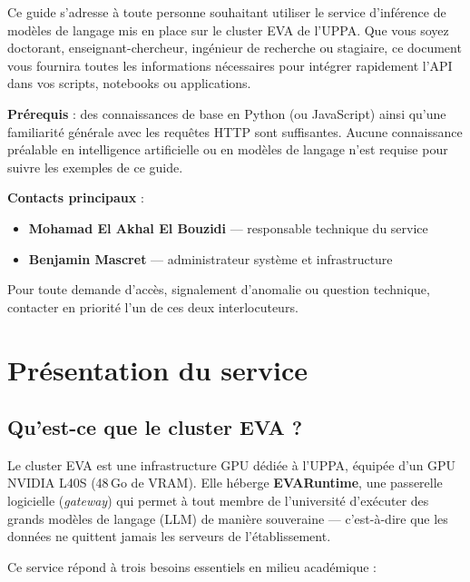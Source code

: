 \documentclass[12pt, a4paper, twoside]{article}
\begin{document}
Ce guide s'adresse à toute personne souhaitant utiliser le service d'inférence de modèles de
langage mis en place sur le cluster EVA de l'UPPA. Que vous soyez doctorant, enseignant-chercheur,
ingénieur de recherche ou stagiaire, ce document vous fournira toutes les informations nécessaires
pour intégrer rapidement l'API dans vos scripts, notebooks ou applications.

\textbf{Prérequis} : des connaissances de base en Python (ou JavaScript) ainsi qu'une familiarité
générale avec les requêtes HTTP sont suffisantes. Aucune connaissance préalable en intelligence
artificielle ou en modèles de langage n'est requise pour suivre les exemples de ce guide.

\textbf{Contacts principaux} :
\begin{itemize}
  \item \textbf{Mohamad El Akhal El Bouzidi} --- responsable technique du service
  \item \textbf{Benjamin Mascret} --- administrateur système et infrastructure
\end{itemize}

Pour toute demande d'accès, signalement d'anomalie ou question technique, contacter en priorité
l'un de ces deux interlocuteurs.

\section{Présentation du service}

\subsection{Qu'est-ce que le cluster EVA ?}

Le cluster EVA est une infrastructure GPU dédiée à l'UPPA, équipée d'un GPU NVIDIA L40S
(48\,Go de VRAM). Elle héberge \textbf{EVARuntime}, une passerelle logicielle (\textit{gateway})
qui permet à tout membre de l'université d'exécuter des grands modèles de langage (LLM) de manière
souveraine --- c'est-à-dire que les données ne quittent jamais les serveurs de l'établissement.

Ce service répond à trois besoins essentiels en milieu académique :
\end{document}
